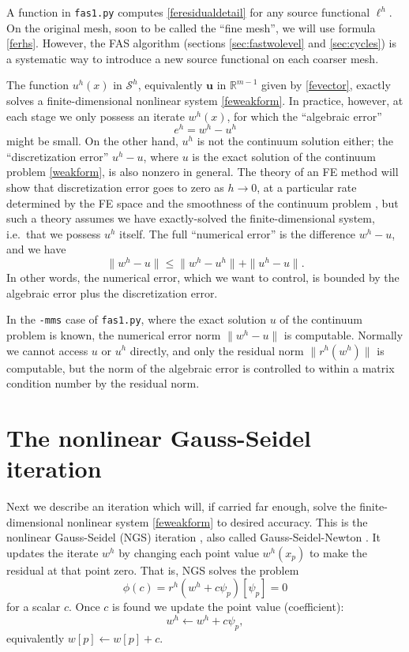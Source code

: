 \documentclass[letterpaper,final,12pt,reqno]{amsart}
\newcommand{\RR}{\mathbb{R}}
\newcommand{\bu}{\mathbf{u}}
\begin{document}
A function in \texttt{fas1.py} computes \eqref{feresidualdetail} for any source functional $\ell^h$.  On the original mesh, soon to be called the ``fine mesh'', we will use formula \eqref{ferhs}.  However, the FAS algorithm (sections \ref{sec:fastwolevel} and \ref{sec:cycles}) is a systematic way to introduce a new source functional on each coarser mesh.

The function $u^h(x)$ in $\mathcal{S}^h$, equivalently $\bu$ in $\RR^{m-1}$ given by \eqref{fevector}, exactly solves a finite-dimensional nonlinear system \eqref{feweakform}.  In practice, however, at each stage we only possess an iterate $w^h(x)$, for which the ``algebraic error''
\begin{equation}
  e^h = w^h - u^h  \label{feerror}
\end{equation}
might be small.  On the other hand, $u^h$ is not the continuum solution either; the ``discretization error'' $u^h-u$, where $u$ is the exact solution of the continuum problem \eqref{weakform}, is also nonzero in general.  The theory of an FE method will show that discretization error goes to zero as $h\to 0$, at a particular rate determined by the FE space and the smoothness of the continuum problem \cite{Elmanetal2014}, but such a theory assumes we have exactly-solved the finite-dimensional system, i.e.~that we possess $u^h$ itself.  The full ``numerical error'' is the difference $w^h-u$, and we have
\begin{equation}
\|w^h-u\| \le \|w^h-u^h\|+\|u^h-u\|.
\end{equation}
In other words, the numerical error, which we want to control, is bounded by the algebraic error plus the discretization error.

In the \texttt{-mms} case of \texttt{fas1.py}, where the exact solution $u$ of the continuum problem is known, the numerical error norm $\|w^h-u\|$ is computable.  Normally we cannot access $u$ or $u^h$ directly, and only the residual norm $\|r^h(w^h)\|$ is computable, but the norm of the algebraic error is controlled to within a matrix condition number by the residual norm.


\section{The nonlinear Gauss-Seidel iteration}  \label{sec:ngs}

Next we describe an iteration which will, if carried far enough, solve the finite-dimensional nonlinear system \eqref{feweakform} to desired accuracy.  This is the nonlinear Gauss-Seidel (NGS) iteration \cite{Briggsetal2000}, also called Gauss-Seidel-Newton \cite{BrandtLivne2011}.  It updates the iterate $w^h$ by changing each point value $w^h(x_p)$ to make the residual at that point zero.  That is, NGS solves the problem
\begin{equation}
\phi(c) = r^h(w^h + c \psi_p)[\psi_p] = 0  \label{ngspointproblem}
\end{equation}
for a scalar $c$.  Once $c$ is found we update the point value (coefficient):
\begin{equation}
  w^h \leftarrow w^h + c \psi_p,  \label{ngspointupdate}
\end{equation}
equivalently $w[p] \leftarrow w[p] + c$.
\end{document}
